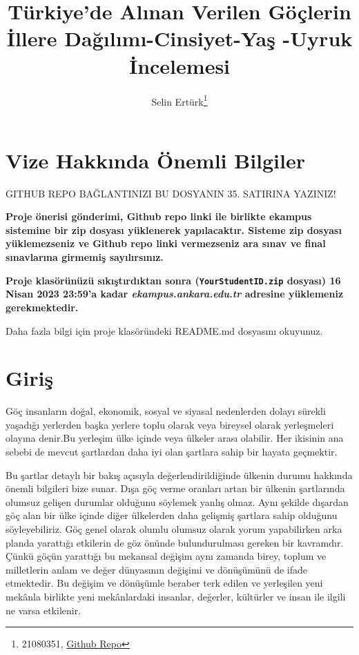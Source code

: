 \documentclass[
  12pt,
]{article}
\title{Türkiye'de Alınan Verilen Göçlerin İllere Dağılımı-Cinsiyet-Yaş -Uyruk İncelemesi}
\author{Selin Ertürk\footnote{21080351, \href{https://github.com/selinerturk/Vize}{Github Repo}}}
\date{}
\begin{document}
\maketitle

\hypertarget{vize-hakkux131nda-uxf6nemli-bilgiler}{%
\section{Vize Hakkında Önemli Bilgiler}\label{vize-hakkux131nda-uxf6nemli-bilgiler}}

\colorbox{BurntOrange}{GITHUB REPO BAĞLANTINIZI BU DOSYANIN 35. SATIRINA YAZINIZ!}

\textbf{Proje önerisi gönderimi, Github repo linki ile birlikte ekampus sistemine bir zip dosyası yüklenerek yapılacaktır. Sisteme zip dosyası yüklemezseniz ve Github repo linki vermezseniz ara sınav ve final sınavlarına girmemiş sayılırsınız.}

\textbf{Proje klasörünüzü sıkıştırdıktan sonra (\texttt{YourStudentID.zip} dosyası) 16 Nisan 2023 23:59'a kadar \emph{ekampus.ankara.edu.tr} adresine yüklemeniz gerekmektedir.}

\colorbox{WildStrawberry}{Daha fazla bilgi için proje klasöründeki README.md dosyasını okuyunuz.}

\hypertarget{giriux15f}{%
\section{Giriş}\label{giriux15f}}

Göç insanların doğal, ekonomik, sosyal ve siyasal nedenlerden dolayı sürekli yaşadığı yerlerden başka yerlere toplu olarak veya bireysel olarak yerleşmeleri olayına denir.Bu yerleşim ülke içinde veya ülkeler arası olabilir. Her ikisinin ana sebebi de mevcut şartlardan daha iyi olan şartlara sahip bir hayata geçmektir.

Bu şartlar detaylı bir bakış açısıyla değerlendirildiğinde ülkenin durumu hakkında önemli bilgileri bize sunar. Dışa göç verme oranları artan bir ülkenin şartlarında olumsuz gelişen durumlar olduğunu söylemek yanlış olmaz. Aynı şekilde dışardan göç alan bir ülke içinde diğer ülkelerden daha gelişmiş şartlara sahip olduğunu söyleyebiliriz. Göç genel olarak olumlu olumsuz olarak yorum yapabilirken arka planda yarattığı etkilerin de göz önünde bulundurulması gereken bir kavramdır. Çünkü göçün yarattığı bu mekansal değişim aynı zamanda birey, toplum ve milletlerin anlam ve değer dünyasının değişimi ve dönüşümünü de ifade etmektedir. Bu değişim ve dönüşümle beraber terk edilen ve yerleşilen yeni mekânla birlikte yeni mekânlardaki insanlar, değerler, kültürler ve insan ile ilgili ne varsa etkilenir.
\end{document}
